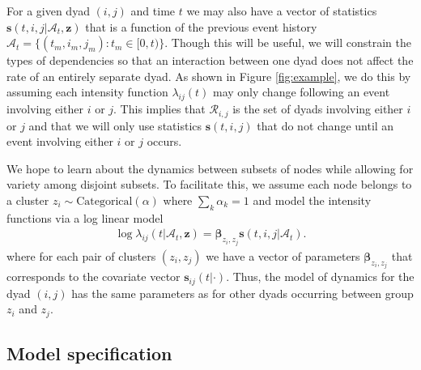 \documentclass[11pt]{article}
\begin{document}
For a given dyad $(i,j)$ and time $t$ we may also have a vector of statistics $\mathbf{s}(t,i,j|\mathcal{A}_t,\mathbf{z})$ that is a function of the previous event history  $\mathcal{A}_t = \{(t_m,i_m,j_m): t_m \in [0,t)\}$.   Though this will be useful, we will constrain the types of dependencies so that an interaction between one dyad does not affect the rate of an entirely separate dyad.  As shown in Figure \ref{fig:example}, we do this by assuming each intensity function $\lambda_{ij}(t)$ may only change following an event involving either $i$ or $j$.  This implies that  $\mathcal{R}_{i,j}$ is the set of dyads involving either $i$ or $j$ and that we will only use  statistics $\mathbf{s}(t,i,j)$ that do not change until an event involving either $i$ or $j$ occurs.  

We hope to learn about the dynamics between subsets of nodes while allowing for variety among disjoint subsets.   To facilitate this, we assume each node belongs to a cluster $z_i \sim \mbox{Categorical}(\alpha)$ where $\sum_k \alpha_k = 1$ and  model the intensity functions via a log linear model
\begin{align}
\log \lambda_{ij}(t | \mathcal{A}_t,\mathbf{z}) = \boldsymbol{\beta}_{z_i,z_j} \mathbf{s}(t,i,j|\mathcal{A}_t).
\end{align}
where for each pair of clusters $(z_i,z_j)$ we have a vector of parameters $\boldsymbol{\beta}_{z_i,z_j}$ that corresponds to the covariate vector $\mathbf{s}_{ij}(t|\cdot)$.   Thus, the model of dynamics for the dyad $(i,j)$ has the same parameters as for other dyads occurring between group $z_i$ and $z_j$. 

\subsection{Model specification}
\end{document}
